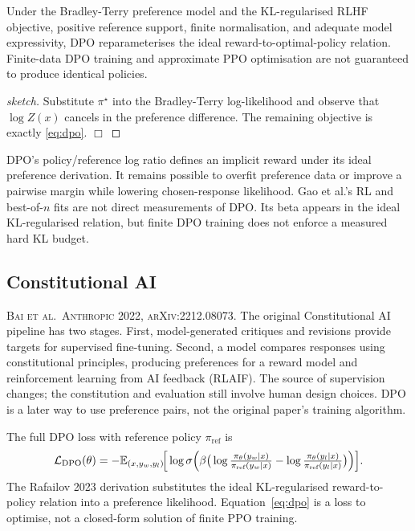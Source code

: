 \documentclass[11pt,oneside]{scrbook}
\begin{document}
\begin{theorem}
Under the Bradley-Terry preference model and the KL-regularised RLHF
objective, positive reference support, finite normalisation, and adequate
model expressivity, DPO reparameterises the ideal reward-to-optimal-policy
relation. Finite-data DPO training and approximate PPO optimisation are
not guaranteed to produce identical policies.
\end{theorem}

\begin{proof}[sketch]
Substitute $\pi^\star$ into the Bradley-Terry log-likelihood and
observe that $\log Z(x)$ cancels in the preference difference. The
remaining objective is exactly \eqref{eq:dpo}. $\Box$
\end{proof}

\begin{pitfall}
DPO's policy/reference log ratio defines an implicit reward under its
ideal preference derivation. It remains possible to overfit preference data
or improve a pairwise margin while lowering chosen-response likelihood.
Gao et al.'s RL and best-of-$n$ fits are not direct measurements of DPO.
Its beta appears in the ideal KL-regularised relation, but finite DPO training
does not enforce a measured hard KL budget.
\end{pitfall}

\subsection*{Constitutional AI}

\textsc{Bai et al.\ Anthropic 2022, arXiv:2212.08073.} The original
Constitutional AI pipeline has two stages. First, model-generated critiques
and revisions provide targets for supervised fine-tuning. Second, a model
compares responses using constitutional principles, producing preferences
for a reward model and reinforcement learning from AI feedback (RLAIF).
The source of supervision changes; the constitution and evaluation still
involve human design choices. DPO is a later way to use preference pairs,
not the original paper's training algorithm.

The full DPO loss with reference policy $\pi_\text{ref}$ is
\begin{equation}\label{eq:dpo}
  \mathcal{L}_\text{DPO}(\theta) = -\mathbb{E}_{(x, y_w, y_l)}\!\Big[\log \sigma\Big(\beta\big(\log\tfrac{\pi_\theta(y_w|x)}{\pi_\text{ref}(y_w|x)} - \log\tfrac{\pi_\theta(y_l|x)}{\pi_\text{ref}(y_l|x)}\big)\Big)\Big].
\end{equation}
The Rafailov 2023 derivation substitutes the ideal KL-regularised
reward-to-policy relation into a preference likelihood. Equation~\eqref{eq:dpo}
is a loss to optimise, not a closed-form solution of finite PPO training.
\end{document}
